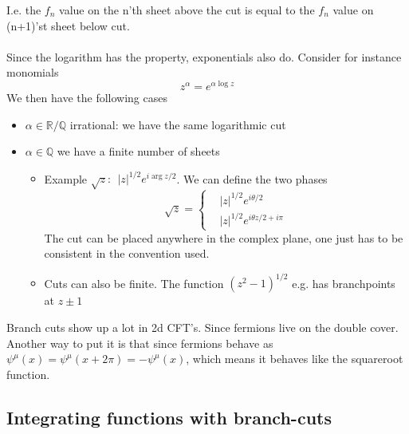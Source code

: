 \documentclass[a4paper,12pt]{article}
\begin{document}
I.e. the $f_n$ value on the n'th sheet above the cut is equal to the $f_n$ value on (n+1)'st sheet below cut.\\\\
Since the logarithm has the property, exponentials also do. Consider for instance monomials
\begin{equation}
z^{\alpha}=e^{\alpha\log z}
\end{equation}
We then have the following cases
\begin{itemize}
\item $\alpha\in \mathds R / \mathds Q$   irrational: we have the same logarithmic cut
\item  $\alpha\in \mathds Q$ we have a finite number of sheets
\begin{itemize}
\item Example $\sqrt{z}:~~|z|^{1/2}e^{i\arg z/2}$. We can define the two phases
\begin{equation}
\sqrt{z}=\begin{cases}
&|z|^{1/2}e^{i\theta /2}\\
&|z|^{1/2}e^{i\theta z/2+i\pi}
\end{cases}
\end{equation}
The cut can be placed anywhere in the complex plane, one just has to be consistent in the convention used. 
\item Cuts can also be finite. The function $(z^2-1)^{1/2}$ e.g. has branchpoints at $z\pm 1$
\end{itemize}
\end{itemize}
Branch cuts show up a lot in 2d CFT's. Since fermions live on the double cover. Another way to put it is that since fermions behave as $\psi^\mu(x)=\psi^\mu(x+2\pi)=-\psi^\mu(x)$, which means it behaves like the squareroot function.
\subsection{Integrating functions with branch-cuts}
\end{document}
